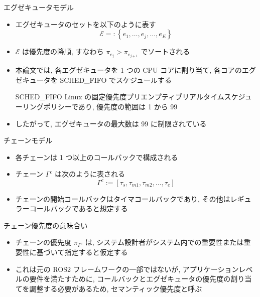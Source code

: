 \begin{frame}{エグゼキュータモデル}
    \begin{itemize}
        \item エグゼキュータのセットを以下のように表す
              \vspace{-2mm}
              \begin{equation*}
                  \mathcal{E}=:\left\{e_{1}, \ldots, e_{j}, \ldots, e_{E}\right\}
              \end{equation*}

        \item $\mathcal{E}$ は優先度の降順, すなわち $\pi_{e_{j}}>\pi_{e_{j+1}}$ でソートされる
        \item 本論文では, 各エグゼキュータを 1 つの CPU コアに割り当て, 各コアのエグゼキュータを SCHED\_FIFO でスケジュールする
              \begin{block}{SCHED\_FIFO}
                  Linux の固定優先度プリエンプティブリアルタイムスケジューリングポリシーであり, 優先度の範囲は 1 から 99
              \end{block}
              \vspace{5mm}
        \item したがって, エグゼキュータの最大数は 99 に制限されている
    \end{itemize}
\end{frame}

\begin{frame}{チェーンモデル}
    \begin{itemize}
        \item 各チェーンは 1 つ以上のコールバックで構成される
        \item チェーン $\Gamma^{c}$ は次のように表される
              \vspace{-2mm}
              \begin{equation*}
                  \Gamma^{c}:=\left[\tau_{s}, \tau_{m 1}, \tau_{m 2}, \ldots, \tau_{e}\right]
              \end{equation*}
        \item チェーンの開始コールバックはタイマコールバックであり, その他はレギュラーコールバックであると想定する
    \end{itemize}
\end{frame}

\begin{frame}{チェーン優先度の意味合い}
    \begin{itemize}
        \item チェーンの優先度 $\pi_{\Gamma^{c}}$ は, システム設計者がシステム内での重要性または重要性に基づいて指定すると仮定する
        \item これは元の ROS2 フレームワークの一部ではないが, アプリケーションレベルの要件を満たすために, コールバックとエグゼキュータの優先度の割り当てを調整する必要があるため, セマンティック優先度と呼ぶ
    \end{itemize}
\end{frame}
